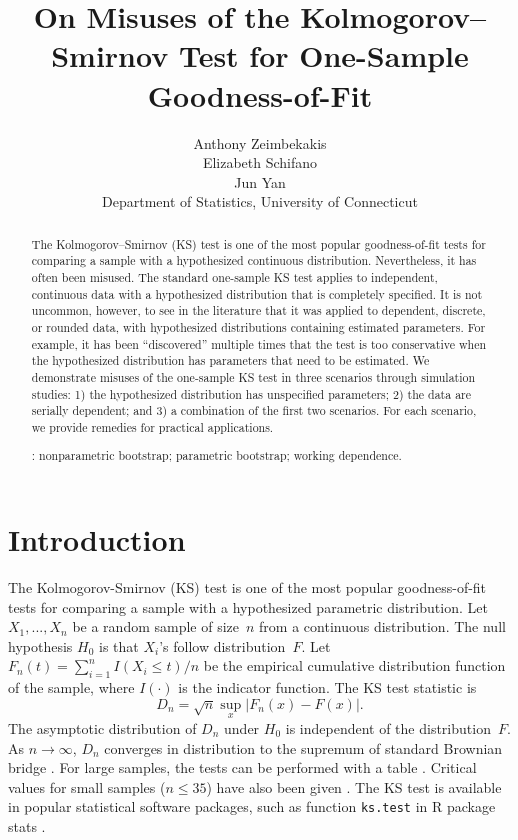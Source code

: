 \documentclass[12pt, letterpaper, titlepage]{article}
\title{On Misuses of the Kolmogorov--Smirnov Test for One-Sample Goodness-of-Fit}
\author{Anthony Zeimbekakis\\
  Elizabeth Schifano\\
  Jun Yan\\[1ex]
  Department of Statistics, University of Connecticut\\
}
\date{}
\begin{document}
\maketitle

\doublespace

\begin{abstract}
The Kolmogorov--Smirnov (KS) test is one of the most popular goodness-of-fit
tests for comparing a sample with a hypothesized continuous distribution.
Nevertheless, it has often been misused. The standard one-sample KS test applies
to independent, continuous data with a hypothesized distribution that is
completely specified. It is not uncommon, however, to see in the literature that
it was applied to dependent, discrete, or rounded data, with hypothesized
distributions containing estimated parameters. For example, it has been
``discovered'' multiple times that the test is too conservative when the 
hypothesized distribution has parameters that need to be estimated.
We demonstrate misuses of the one-sample KS test in
three scenarios through simulation studies:
1) the hypothesized distribution has unspecified parameters;
2) the data are serially dependent; and
3) a combination of the first two scenarios.
For each scenario, we provide remedies for practical applications.

\bigskip
{}:
nonparametric bootstrap;
parametric bootstrap;
working dependence.
\end{abstract}

\section{Introduction}
\label{sec:intro}

The Kolmogorov-Smirnov (KS) test is one of the most popular goodness-of-fit
tests for comparing a sample with a hypothesized parametric distribution.
Let $X_1, ..., X_n$ be a random sample of size~$n$ from a continuous
distribution. The null hypothesis $H_0$ is that $X_i$'s follow distribution~$F$.
Let $F_n(t) = \sum_{i=1}^n I(X_i \le t) / n$ be the empirical cumulative
distribution function of the sample, where $I(\cdot)$ is the indicator
function. The KS test statistic is
\begin{equation}
  \label{eq:ks_standard}
  D_n = \sqrt{n} \sup_x | F_{n}(x) - F(x) |.
\end{equation}
The asymptotic distribution of $D_n$ under $H_0$ is independent of the
distribution~$F$. As $n \to \infty$, $D_n$ converges in distribution to
the supremum of standard Brownian bridge \citep{kolmogorov1933sulla}. For large
samples, the tests can be performed with a table \citep{smirnov1948table}.
Critical values for small samples ($n \le 35$) have also been given
\citep{massey1951kolmogorov}. The KS test is available in popular
statistical software packages, such as function \texttt{ks.test} in R package
\textsf{stats} \citep{R, marsaglia2003evaluating}.
\end{document}

